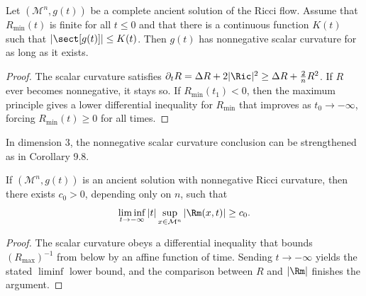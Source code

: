 \begin{lemma}
\label{ch09-lem-ancient-nonnegative-scalar}
Let \((\mathcal M^n,g(t))\) be a complete ancient solution of the Ricci flow. Assume that \(R_{\min}(t)\) is finite for all \(t\le 0\) and that there is a continuous function \(K(t)\) such that \(|\sect[g(t)]|\le K(t)\). Then \(g(t)\) has nonnegative scalar curvature for as long as it exists.
\end{lemma}

\begin{proof}
\sketch The scalar curvature satisfies \(\partial_t R=\Delta R+2|\Ric|^2\ge \Delta R+\frac{2}{n}R^2\). If \(R\) ever becomes nonnegative, it stays so. If \(R_{\min}(t_1)<0\), then the maximum principle gives a lower differential inequality for \(R_{\min}\) that improves as \(t_0\to-\infty\), forcing \(R_{\min}(t)\ge 0\) for all times.
\end{proof}

\begin{remark}
\label{ch09-rem-ancient-scalar-three-dimensional}
In dimension \(3\), the nonnegative scalar curvature conclusion can be strengthened as in Corollary 9.8.
\end{remark}

\begin{lemma}
\label{ch09-lem-ancient-lower-blowup-rate}
If \((\mathcal M^n,g(t))\) is an ancient solution with nonnegative Ricci curvature, then there exists \(c_0>0\), depending only on \(n\), such that
\[
\liminf_{t\to -\infty}|t|\sup_{x\in\mathcal M^n}|\Rm(x,t)|\ge c_0.
\]
\end{lemma}

\begin{proof}
\sketch The scalar curvature obeys a differential inequality that bounds \((R_{\max})^{-1}\) from below by an affine function of time. Sending \(t\to-\infty\) yields the stated \(\liminf\) lower bound, and the comparison between \(R\) and \(|\Rm|\) finishes the argument.
\end{proof}

